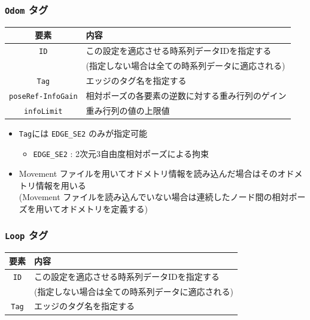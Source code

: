 \documentclass[dvipdfmx]{jsarticle}
\begin{document}
\cprotect \subsubsection{\verb|Odom| タグ}
\begin{tabular}{c|l}
	\hline
	要素 & 内容 \\
	\hline \hline
	\verb|ID| & この設定を適応させる時系列データIDを指定する \vspace{-5pt}\\
		& (指定しない場合は全ての時系列データに適応される) \\
	\verb|Tag| & エッジのタグ名を指定する \\
	\verb|poseRef-InfoGain| & 相対ポーズの各要素の逆数に対する重み行列のゲイン \\
	\verb|infoLimit| & 重み行列の値の上限値 \\
	\hline
\end{tabular}

\begin{itemize}
	\item \verb|Tag|には \verb|EDGE_SE2| のみが指定可能
	\begin{itemize}
		\item[] \verb|EDGE_SE2| : 2次元3自由度相対ポーズによる拘束
	\end{itemize}
	\item Movement ファイルを用いてオドメトリ情報を読み込んだ場合はそのオドメトリ情報を用いる \\
		(Movement ファイルを読み込んでいない場合は連続したノード間の相対ポーズを用いてオドメトリを定義する)
\end{itemize}

\clearpage
\cprotect \subsubsection{\verb|Loop| タグ}
\begin{tabular}{c|l}
	\hline
	要素 & 内容 \\
	\hline \hline
	\verb|ID| & この設定を適応させる時系列データIDを指定する \vspace{-5pt}\\
		& (指定しない場合は全ての時系列データに適応される) \\
	\verb|Tag| & エッジのタグ名を指定する \\
	\hline
\end{tabular}
\end{document}
